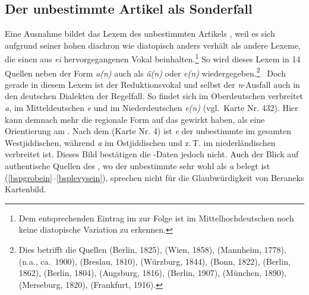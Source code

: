 \subsection{Der unbestimmte Artikel als Sonderfall}\label{artikelkapitel}
 Eine Ausnahme bildet das Lexem des unbestimmten Artikels , weil es sich aufgrund seiner hohen  diachron wie diatopisch anders verhält als andere Lexeme, die einen aus {\mhd} \textit{ei} hervorgegangenen Vokal beinhalten.\footnote{Dem entsprechenden Eintrag im \cite[Bd. 1, Sp. 520]{Lexer1992} zur Folge ist im Mittelhochdeutschen noch keine diatopische Variation zu erkennen.}   So wird dieses Lexem in 14 Quellen neben der Form \textit{a(n)} auch als \textit{ä(n)} oder \textit{e(n)} wiedergegeben.\footnote{Dies betrifft die Quellen  (Berlin, 1825),  (Wien, 1858),  (Mannheim, 1778),  (n.a., ca.\, 1900),  (Breslau, 1810),  (Würzburg, 1844),  (Bonn, 1822),  (Berlin, 1862),  (Berlin, 1804),  (Augsburg, 1816),  (Berlin, 1907),  (München, 1890),  (Merseburg, 1820),  (Frankfurt, 1916).} \,%
 Doch gerade in diesem Lexem ist der Reduktionsvokal und selbst der \textit{n}-Ausfall auch in den deutschen Dialekten der Regelfall. So findet sich im Oberdeutschen verbreitet \textit{a}, im Mitteldeutschen \textit{e} und im Niederdeutschen \textit{e(n)} (vgl.\,  Karte Nr. 432). Hier kann demnach mehr die regionale Form auf das \hai{{\LiJi}} gewirkt haben, als eine Orientierung am \hai{{\WJ}}. Nach dem  (Karte Nr. 4) ist \textit{e} der unbestimmte  im gesamten Westjiddischen, während \textit{a} im Ostjiddischen und z.\,T. im niederländischen \hai{{\NWJ}} verbreitet ist. Dieses Bild bestätigen die \hai{{\LiJieins}}-Daten jedoch nicht. Auch der Blick auf authentische Quellen des \hai{{\WJ}}, wo der unbestimmte  sehr wohl als \textit{a} belegt ist (\ref{bspgrobein}–\ref{bsplevysein}), sprechen nicht für die Glaubwürdigkeit von Beraneks Kartenbild.

 
